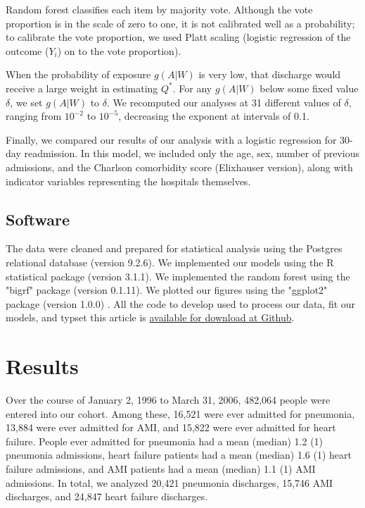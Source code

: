 \documentclass[]{article}\usepackage[]{graphicx}\usepackage[]{color}
\begin{document}
Random forest classifies each item by majority vote. Although the vote proportion is in the scale of zero to one, it is not calibrated well as a probability; to calibrate the vote proportion, we used Platt scaling\supercite{platt_probabilistic_1999} (logistic regression of the outcome ($Y_i$) on to the vote proportion).

When the probability of exposure $g(A|W)$ is very low, that discharge would receive a large weight in estimating $Q^*$. For any $g(A|W)$ below some fixed value $\delta$, we set $g(A|W)$ to $\delta$. We recomputed our analyses at 31 different values of $\delta$, ranging from $10^{-2}$ to $10^{-5}$, decreasing the exponent at intervals of 0.1.

Finally, we compared our results of our analysis with a logistic regression for 30-day readmission. In this model, we included only the age, sex, number of previous admissions, and the Charlson comorbidity score (Elixhauser version)\supercite{elixhauser_comorbidity_1998}, along with indicator variables representing the hospitals themselves.

\subsection{Software}
The data were cleaned and prepared for statistical analysis using the Postgres relational database (version 9.2.6). We implemented our models using the R statistical package (version 3.1.1).\supercite{team_r:_2014} We implemented the random forest using the "bigrf" package (version 0.1.11).\supercite{lim_bigrf:_2014} We plotted our figures using the "ggplot2" package (version 1.0.0) .\supercite{wickham_ggplot2:_2009} All the code to develop used to process our data, fit our models, and typset this article is \href{https://github.com/nograpes/tmle_readmissions}{available for download at Github}.

\section{Results}


Over the course of January 2, 1996 to March 31, 2006, 482,064 people were entered into our cohort. Among these, 16,521 were ever admitted for pneumonia, 13,884 were ever admitted for AMI, and 15,822 were ever admitted for heart failure. People ever admitted for pneumonia had a mean (median) 1.2 (1) pneumonia admissions, heart failure patients had a mean (median) 1.6 (1) heart failure admissions, and AMI patients had a mean (median) 1.1 (1) AMI admissions. In total, we analyzed 20,421 pneumonia discharges, 15,746 AMI discharges, and 24,847 heart failure discharges.
\end{document}
